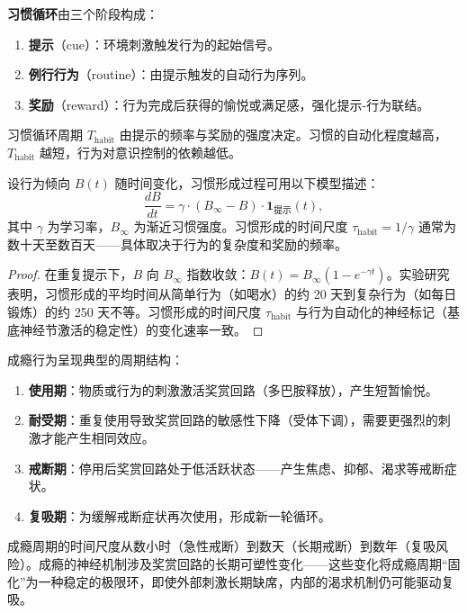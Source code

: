 \begin{definition}[习惯循环的三阶段模型]\label{def:habit_loop}
\textbf{习惯循环}由三个阶段构成：
\begin{enumerate}[label=(\roman*)]
    \item \textbf{提示}（cue）：环境刺激触发行为的起始信号。
    \item \textbf{例行行为}（routine）：由提示触发的自动行为序列。
    \item \textbf{奖励}（reward）：行为完成后获得的愉悦或满足感，强化提示-行为联结。
\end{enumerate}
习惯循环周期 $T_{\text{habit}}$ 由提示的频率与奖励的强度决定。习惯的自动化程度越高，$T_{\text{habit}}$ 越短，行为对意识控制的依赖越低。
\end{definition}

\begin{proposition}[习惯形成的周期特征]\label{prop:habit_formation}
设行为倾向 $B(t)$ 随时间变化，习惯形成过程可用以下模型描述：
\[
\frac{dB}{dt} = \gamma \cdot (B_{\infty} - B) \cdot \mathbf{1}_{\text{提示}}(t),
\]
其中 $\gamma$ 为学习率，$B_{\infty}$ 为渐近习惯强度。习惯形成的时间尺度 $\tau_{\text{habit}} = 1/\gamma$ 通常为数十天至数百天——具体取决于行为的复杂度和奖励的频率。
\end{proposition}

\begin{proof}
在重复提示下，$B$ 向 $B_\infty$ 指数收敛：$B(t) = B_\infty (1 - e^{-\gamma t})$。实验研究表明，习惯形成的平均时间从简单行为（如喝水）的约 20 天到复杂行为（如每日锻炼）的约 250 天不等。习惯形成的时间尺度 $\tau_{\text{habit}}$ 与行为自动化的神经标记（基底神经节激活的稳定性）的变化速率一致。
\end{proof}

\begin{example}[成瘾的周期结构]\label{ex:addiction_cycle}
成瘾行为呈现典型的周期结构：
\begin{enumerate}[label=(\roman*)]
    \item \textbf{使用期}：物质或行为的刺激激活奖赏回路（多巴胺释放），产生短暂愉悦。
    \item \textbf{耐受期}：重复使用导致奖赏回路的敏感性下降（受体下调），需要更强烈的刺激才能产生相同效应。
    \item \textbf{戒断期}：停用后奖赏回路处于低活跃状态——产生焦虑、抑郁、渴求等戒断症状。
    \item \textbf{复吸期}：为缓解戒断症状再次使用，形成新一轮循环。
\end{enumerate}
成瘾周期的时间尺度从数小时（急性戒断）到数天（长期戒断）到数年（复吸风险）。成瘾的神经机制涉及奖赏回路的长期可塑性变化——这些变化将成瘾周期“固化”为一种稳定的极限环，即使外部刺激长期缺席，内部的渴求机制仍可能驱动复吸。
\end{example}

